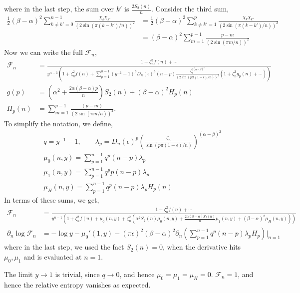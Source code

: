 \documentclass[11pt]{article}
\newcommand{\ep}{\epsilon}
\newcommand{\p}{\partial}
\newcommand{\lb}{\left(}
\newcommand{\rb}{\right)}
\begin{document}
where in the last step, the sum over $k'$ is $\frac{2S_2(n)}{n}$. Consider the third sum,
\begin{align}
    \frac{1}{2}(\beta - \alpha)^2 \sum_{k\neq k'=0}^{n-1} \frac{\chi_k \chi_{k'}}{\lb2\sin (\pi (k-k')/n)\rb^2} &= \frac{1}{2}(\beta - \alpha)^2 \sum_{k\neq k'=1}^{p} \frac{\chi_k \chi_{k'}}{\lb2\sin (\pi (k-k')/n)\rb^2} \\
    &= (\beta-\alpha)^2 \sum_{m=1}^{p-1} \frac{p-m}{\lb2\sin(\pi m /n)\rb^2}
\end{align}
Now we can write the full $\mathcal{F}_n$,
\begin{align}
    \mathcal{F}_n &= \frac
    {1+\zeta_n^{2}f(n)+\cdots}{y^{n-1}\lb 1+\zeta_n^2f(n) + \sum_{p=1}^{n-1} (y^{-1}-1)^pD_n(\ep)^p (n-p) \frac{\zeta_n^{2(\alpha-\beta)^2}}{\lb 2\sin \lb p\pi (1-\ep)/n\rb\rb^2}\lb 1+\zeta_n^2 g_p(n) + \cdots \rb\rb } \\
    g(p) & = \lb  \alpha^2 + \frac{2\alpha (\beta - \alpha)p}{n}\rb S_2(n)  +(\beta - \alpha)^2 H_p(n)\\
    H_p(n) &= \sum_{m=1}^{p-1} \frac{(p-m)}{\lb 2\sin (\pi m /n)\rb^2}.
\end{align}
To simplify the notation, we define,
\begin{align}
    &q = y^{-1}-1, \qquad \lambda_p = D_n(\ep)^p \lb \frac{\zeta_n}{\sin(p \pi (1-\ep)/n)}\rb^{(\alpha - \beta)^2} \\
    &\mu_0(n,y) = \sum_{p=1}^{n-1} q^p (n-p)\lambda_p \\
    & \mu_1(n,y) = \sum_{p=1}^{n-1}q^p p(n-p) \lambda_p \\
    &\mu_H(n,y) = \sum_{p=1}^{n-1} q^p (n-p) \lambda_p H_p(n)
\end{align}
In terms of these sums, we get,
\begin{align}
    \mathcal{F}_n &= \frac{1 + \zeta_n^2 f(n)+\cdots}{y^{n-1}\lb  1+ \zeta_n^2 f(n) + \mu_0(n,y) + \zeta_n^2\lb  \alpha^2 S_2(n) \mu_0(n,y)+ \frac{2\alpha (\beta - \alpha)S_2(n)}{n} \mu_1(n,y) + (\beta - \alpha)^2 \mu_H(n,y)\rb \rb} \\
    \p_n \log \mathcal{F}_n &= -\log y - \mu_0'(1,y) - (\pi \ep)^2 (\beta - \alpha)^2 \p_n \lb \sum_{p=1}^{n-1} q^p (n-p) \lambda_p H_p \rb \Bigg|_{n=1}
\end{align}
where in the last step, we used the fact $S_2(n)=0$, when the derivative hits $\mu_0,\mu_1$ and is evaluated at $n=1$. 

The limit $y\to 1$ is trivial, since $q \to 0$, and hence $\mu_0 = \mu_1 = \mu_H = 0$. $\mathcal{F}_n = 1$, and hence the relative entropy vanishes as expected. 
\end{document}
